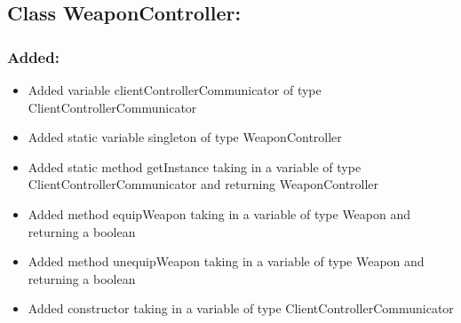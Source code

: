 \documentclass{article}
\begin{document}

\subsection{Class WeaponController:}

\subsubsection{Added:}
\begin{itemize}
\item Added variable clientControllerCommunicator of type ClientControllerCommunicator
\item Added static variable singleton of type WeaponController
\item Added static method getInstance taking in a variable of type ClientControllerCommunicator and returning WeaponController
\item Added method equipWeapon taking in a variable of type Weapon and returning a boolean
\item Added method unequipWeapon taking in a variable of type Weapon and returning a boolean
\item Added constructor taking in a variable of type ClientControllerCommunicator
\end{itemize}
\end{document}
